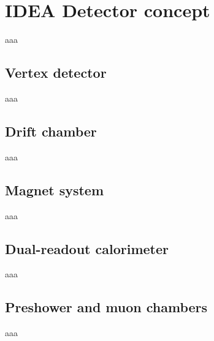 \chapter{IDEA Detector concept} \label{chap:Idea_project}
aaa

\section{Vertex detector}
aaa

\section{Drift chamber}
aaa

\section{Magnet system}
aaa

\section{Dual-readout calorimeter}
aaa

\section{Preshower and muon chambers}
aaa
